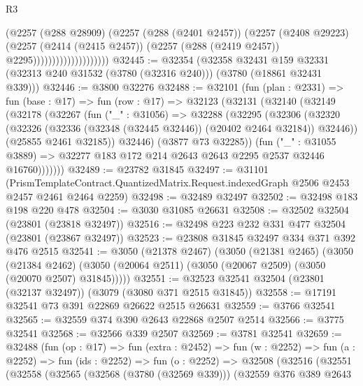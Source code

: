 \begin{lexlean}{R3}
\begin{coremodule}
                                  (@2257
                                    (@288 @28909)
                                    (@2257
                                      (@288 (@2401 @2457))
                                      (@2257
                                        (@2408 @29223)
                                        (@2257
                                          (@2414 (@2415 @2457))
                                          (@2257 (@288 (@2419 @2457)) @2295))))))))))))))))))))
@32445 := @32354
    (@32358
      @32431
      @159
      @32331
      (@32313 @240 @31532 (@3780 (@32316 @240)))
      (@3780 (@18861 @32431 @339)))
@32446 := @3800 @32276
@32488 := @32101
    (fun (plan : @2331) =>
    fun (base : @17) =>
    fun (row : @17) =>
    @32123
      (@32131
        (@32140
          (@32149
            (@32178
              (@32267
                (fun ("_" : @31056) =>
                @32288
                  (@32295
                    (@32306
                      (@32320
                        (@32326 (@32336 (@32348 (@32445 @32446)) (@20402 @2464 @32184)) @32446))
                      (@25855 @2461 @32185))
                    @32446)
                  (@3877 @73 @32285))
                (fun ("_" : @31055 @3889) =>
                @32277 @183 @172 @214 @2643 @2643 @2295 @2537 @32446 @16760)))))))
@32489 := @23782 @31845
@32497 := @31101
    (PrismTemplateContract.QuantizedMatrix.Request.indexedGraph @2506 @2453 @2457 @2461 @2464 @2259)
@32498 := @32489 @32497
@32502 := @32498 @183 @198 @220 @478
@32504 := @3030 @31085 @26631
@32508 := @32502 @32504 (@23801 (@23818 @32497))
@32516 := @32498 @223 @232 @331 @477 @32504 (@23801 (@23867 @32497))
@32523 := @23808 @31845 @32497 @334 @371 @392 @476 @2515
@32541 := @3050
    (@21378 @2467)
    (@3050
      (@21381 @2465)
      (@3050
        (@21384 @2462)
        (@3050 (@20064 @2511) (@3050 (@20067 @2509) (@3050 (@20070 @2507) @31845)))))
@32551 := @32523 @32541 @32504 (@23801 (@32137 @32497)) (@3079 (@3080 @371 @2515 @31845))
@32558 := @17191 @32541 @73 @391 @22869 @26622 @2515 @26631
@32559 := @3766 @32541
@32565 := @32559 @374 @390 @2643 @22868 @2507 @2514
@32566 := @3775 @32541
@32568 := @32566 @339 @2507
@32569 := @3781 @32541
@32659 := @32488
    (fun (op : @17) =>
    fun (extra : @2452) =>
    fun (w : @2252) =>
    fun (a : @2252) =>
    fun (ids : @2252) =>
    fun (o : @2252) =>
    @32508
      (@32516
        (@32551
          (@32558
            (@32565
              (@32568 (@3780 (@32569 @339)))
              (@32559
                @376
                @389
                @2643

\end{coremodule}
\end{lexlean}
